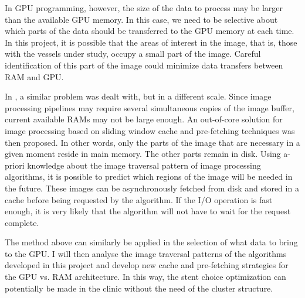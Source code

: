 In GPU programming, however, the size of the data to process may be larger than the available GPU memory. In this case, we need to be selective about which parts of the data should be transferred to the GPU memory at each time. In this project, it is possible that the areas of interest in the image, that is, those with the vessels under study, occupy a small part of the image. Careful identification of this part of the image could minimize data transfers between RAM and GPU. 

\approach
In \citep{Pinho:Cache1}, a similar problem was dealt with, but in a different scale. Since image processing pipelines may require several simultaneous copies of the image buffer, current available RAMs may not be large enough. An out-of-core solution for image processing based on sliding window cache and pre-fetching techniques was then proposed. In other words, only the parts of the image that are necessary in a given moment reside in main memory. The other parts remain in disk. Using a-priori knowledge about the image traversal pattern of image processing algorithms, it is possible to predict which regions of the image will be needed in the future. These images can be asynchronously fetched from disk and stored in a cache before being requested by the algorithm. If the I/O operation is fast enough, it is very likely that the algorithm will not have to wait for the request complete. 

The method above can similarly be applied in the selection of what data to bring to the GPU. I will then analyse the image traversal patterns of the algorithms developed in this project and develop new cache and pre-fetching strategies for the GPU vs. RAM architecture. In this way, the stent choice optimization can potentially be made in the clinic without the need of the cluster structure.


